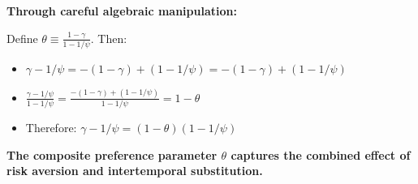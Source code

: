 \documentclass{beamer}
\begin{document}
\begin{frame}[allowframebreaks]
    \textbf{Through careful algebraic manipulation:}
    
    Define $\theta \equiv \frac{1-\gamma}{1-1/\psi}$. Then:
    \begin{itemize}
        \item $\gamma - 1/\psi = -(1-\gamma) + (1-1/\psi) = -(1-\gamma) + (1-1/\psi)$
        \item $\frac{\gamma - 1/\psi}{1-1/\psi} = \frac{-(1-\gamma) + (1-1/\psi)}{1-1/\psi} = 1 - \theta$
        \item Therefore: $\gamma - 1/\psi = (1-\theta)(1-1/\psi)$
    \end{itemize}
    
    \textbf{The composite preference parameter $\theta$ captures the combined effect of risk aversion and intertemporal substitution.}
\end{frame}
\end{document}
